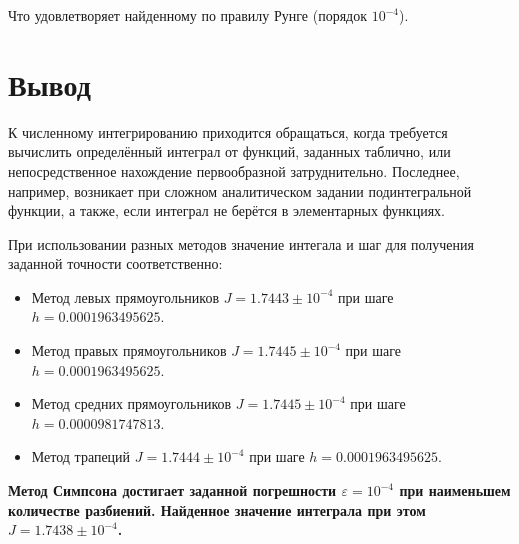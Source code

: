 \documentclass[a4paper,11pt]{article}
\begin{document}
Что удовлетворяет найденному по правилу Рунге (порядок $10^{-4}$).

\section{Вывод}

К численному интегрированию приходится обращаться, когда требуется вычислить определённый интеграл от функций, заданных таблично, или
непосредственное нахождение первообразной затруднительно. Последнее,
например, возникает при сложном аналитическом задании подинтегральной
функции, а также, если интеграл не берётся в элементарных функциях.

При использовании разных методов значение интегала и шаг для получения заданной точности соответственно:

\begin{itemize}
\item Метод левых прямоугольников $J = 1.7443 \pm 10^{-4}$ при шаге $h = 0.0001963495625$.
\item Метод правых прямоугольников $J = 1.7445 \pm 10^{-4}$ при шаге $h = 0.0001963495625$.
\item Метод средних прямоугольников $J = 1.7445 \pm 10^{-4}$ при шаге $h = 0.0000981747813$.
\item Метод трапеций $J = 1.7444 \pm 10^{-4}$ при шаге $h = 0.0001963495625$.
\end{itemize}

\textbf{Метод Симпсона достигает заданной погрешности $\varepsilon = 10^{-4}$ при наименьшем количестве разбиений. Найденное значение интеграла при этом $J = 1.7438\pm10^{-4}$.}
\end{document}
